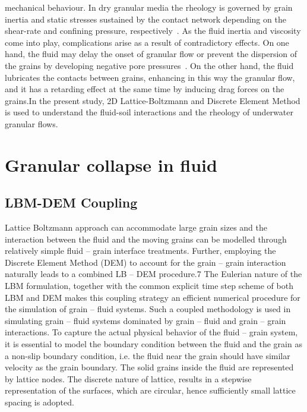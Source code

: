 mechanical behaviour. In dry granular media the rheology is governed by grain 
inertia and static stresses sustained by the contact network depending on the 
shear-rate and confining pressure, respectively~\citep{Midi2004}. As the fluid 
inertia and viscosity come into play, complications arise as a result of 
contradictory effects. On one hand, the fluid may delay the onset of
granular flow or prevent the dispersion of the grains by
developing negative pore pressures~\citep{Pailha2008,Topin2011}. On the other
hand, the fluid lubricates the contacts between grains, enhancing in this way 
the granular flow, and it has a retarding effect at the same time by inducing 
drag forces on the grains.In the present study, 2D Lattice-Boltzmann and 
Discrete Element Method is used to understand the fluid-soil interactions and 
the rheology of underwater granular flows.

\section{Granular collapse in fluid}

\subsection{LBM-DEM Coupling}

Lattice Boltzmann approach can accommodate large grain sizes and the 
interaction between the fluid and the moving grains can be modelled through 
relatively simple fluid – grain interface treatments. Further, employing the 
Discrete Element Method (DEM) to account for the grain – grain interaction 
naturally leads to a combined LB – DEM procedure.7 The Eulerian nature of the 
LBM formulation, together with the common explicit time step scheme of both LBM 
and DEM makes this coupling strategy an efficient numerical procedure for the 
simulation of grain – fluid systems. Such a coupled methodology is used in 
simulating grain – fluid systems dominated by grain – fluid and grain – grain 
interactions. To capture the actual physical behavior of the fluid – grain 
system, it is essential to model the boundary condition between the fluid and 
the grain as a non-slip boundary condition, i.e. the fluid near the grain 
should have similar velocity as the grain boundary. The solid grains inside the 
fluid are represented by lattice nodes. The discrete nature of lattice, results 
in a stepwise representation of the surfaces, which are circular, hence 
sufficiently small lattice spacing is adopted. 

